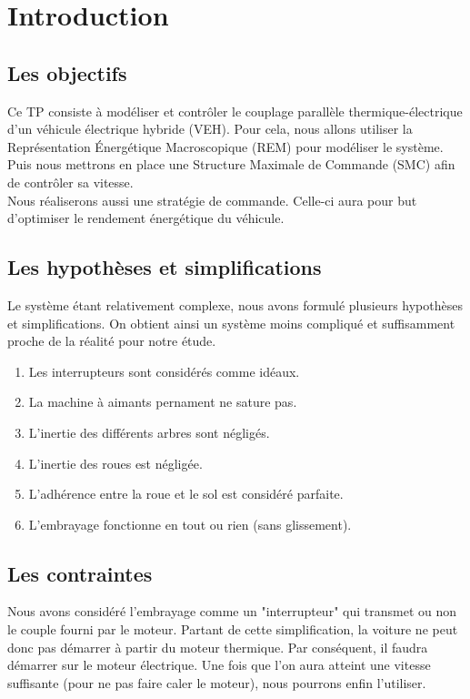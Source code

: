 \section{Introduction}

\subsection{Les objectifs}

	Ce TP consiste à modéliser et contrôler le couplage parallèle thermique-électrique d'un véhicule électrique hybride (VEH). Pour cela, nous allons utiliser la Représentation Énergétique Macroscopique (REM) pour modéliser le système. Puis nous mettrons en place une Structure Maximale de Commande (SMC) afin de contrôler sa vitesse. \\
	Nous réaliserons aussi une stratégie de commande. Celle-ci aura pour but d'optimiser le rendement énergétique du véhicule.

\subsection{Les hypothèses et simplifications}

	Le système étant relativement complexe, nous avons formulé plusieurs hypothèses et simplifications. On obtient ainsi un système moins compliqué et suffisamment proche de la réalité pour notre étude. 

\begin{enumerate} 
\item Les interrupteurs sont considérés comme idéaux.
\item La machine à aimants pernament ne sature pas.
\item L'inertie des différents arbres sont négligés.
\item L'inertie des roues est négligée.
\item L'adhérence entre la roue et le sol est considéré parfaite. 
\item L'embrayage fonctionne en tout ou rien (sans glissement).
\end{enumerate}

\subsection{Les contraintes}
	Nous avons considéré l'embrayage comme un "interrupteur" qui transmet ou non le couple fourni par le moteur. Partant de cette simplification, la voiture ne peut donc pas démarrer à partir du moteur thermique. Par conséquent, il faudra démarrer sur le moteur électrique. Une fois que l'on aura atteint une vitesse suffisante (pour ne pas faire caler le moteur), nous pourrons enfin l'utiliser.

